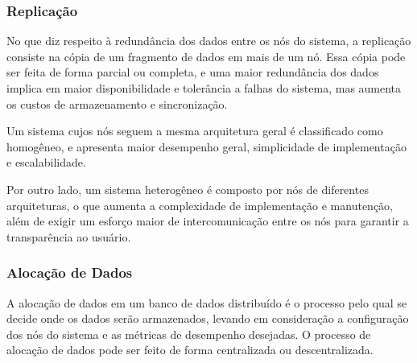 \subsubsection{Replicação}
No que diz respeito à redundância dos dados entre os nós do sistema, a replicação consiste na cópia de um fragmento de dados em mais de um nó. Essa cópia pode ser feita de forma parcial ou completa, e uma maior redundância dos dados implica em maior disponibilidade e tolerância a falhas do sistema, mas aumenta os custos de armazenamento e sincronização.


Um sistema cujos nós seguem a mesma arquitetura geral é classificado como homogêneo, e apresenta maior desempenho geral, simplicidade de implementação e escalabilidade.

Por outro lado, um sistema heterogêneo é composto por nós de diferentes arquiteturas, o que aumenta a complexidade de implementação e manutenção, além de exigir um esforço maior de intercomunicação entre os nós para garantir a transparência ao usuário.

\subsubsection{Alocação de Dados}
A alocação de dados em um banco de dados distribuído é o processo pelo qual se decide onde os dados serão armazenados, levando em consideração a configuração dos nós do sistema e as métricas de desempenho desejadas. O processo de alocação de dados pode ser feito de forma centralizada ou descentralizada.



